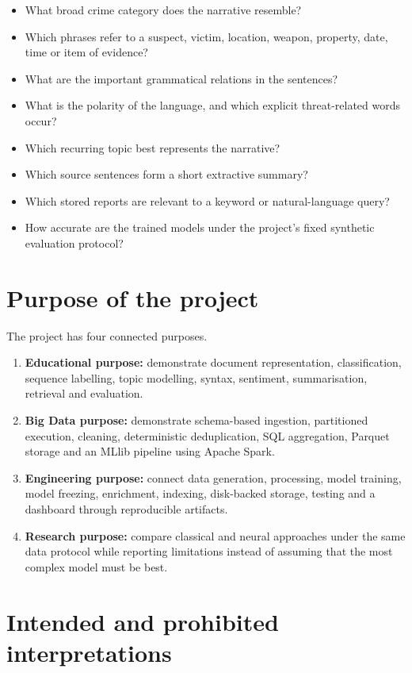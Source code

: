 \documentclass[12pt,a4paper]{report}
\begin{document}
\begin{itemize}
  \item What broad crime category does the narrative resemble?
  \item Which phrases refer to a suspect, victim, location, weapon, property, date, time or item of evidence?
  \item What are the important grammatical relations in the sentences?
  \item What is the polarity of the language, and which explicit threat-related words occur?
  \item Which recurring topic best represents the narrative?
  \item Which source sentences form a short extractive summary?
  \item Which stored reports are relevant to a keyword or natural-language query?
  \item How accurate are the trained models under the project's fixed synthetic evaluation protocol?
\end{itemize}

\section{Purpose of the project}

The project has four connected purposes.

\begin{enumerate}
  \item \textbf{Educational purpose:} demonstrate document representation, classification, sequence labelling, topic modelling, syntax, sentiment, summarisation, retrieval and evaluation.
  \item \textbf{Big Data purpose:} demonstrate schema-based ingestion, partitioned execution, cleaning, deterministic deduplication, SQL aggregation, Parquet storage and an MLlib pipeline using Apache Spark.
  \item \textbf{Engineering purpose:} connect data generation, processing, model training, model freezing, enrichment, indexing, disk-backed storage, testing and a dashboard through reproducible artifacts.
  \item \textbf{Research purpose:} compare classical and neural approaches under the same data protocol while reporting limitations instead of assuming that the most complex model must be best.
\end{enumerate}

\section{Intended and prohibited interpretations}
\end{document}
